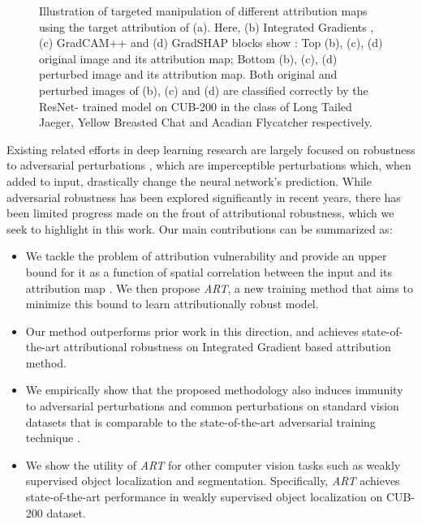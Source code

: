 \documentclass[runningheads]{llncs}
\begin{document}
\begin{figure}[t]
\centering
{}
\caption{\footnotesize{Illustration of targeted manipulation \cite{nips_sal} of different attribution maps using the target attribution of (a). Here, (b) Integrated Gradients \cite{attr2017integrated}, (c) GradCAM++ \cite{attr2017grad++} and (d) GradSHAP \cite{gradshap} blocks show : Top (b), (c), (d)  original image and its attribution map; Bottom (b), (c), (d) perturbed image and its attribution map. Both original and perturbed images of (b), (c) and (d) are classified correctly by the ResNet- trained model on CUB-200 \cite{cub} in the class of Long Tailed Jaeger, Yellow Breasted Chat and Acadian Flycatcher respectively.}}
\label{fig:example_attr}
\end{figure}

Existing related efforts in deep learning research are largely focused on robustness to adversarial perturbations \cite{ian2015harness,szegedy2013intriguing}, which are imperceptible perturbations which, when added to input, drastically change the neural network’s prediction. 
While adversarial robustness has been explored significantly in recent years, there has been limited progress made on the front of attributional robustness, which we seek to highlight in this work. Our main contributions can be summarized as:
\begin{itemize}
    \item We tackle the problem of attribution vulnerability and provide an upper bound for it as a function of spatial correlation between the input and its attribution map \cite{attr2013gradient}. 
    We then propose \textit{ART}, a new training method that aims to minimize this bound to learn attributionally robust model. 
    \item Our method outperforms prior work in this direction, and achieves state-of-the-art attributional robustness on Integrated Gradient \cite{attr2017integrated} based attribution method.
    
    \item We empirically show that the proposed methodology also induces immunity to adversarial perturbations and common perturbations \cite{hendrycks2019robustness} on standard vision datasets that is comparable to the state-of-the-art adversarial training technique \cite{madrypgd}. 

    \item We show the utility of \textit{ART} for other computer vision tasks such as weakly supervised object localization and segmentation. Specifically, \textit{ART} achieves state-of-the-art performance in weakly supervised object localization on CUB-200 \cite{cub} dataset.  
\end{itemize}
\end{document}
